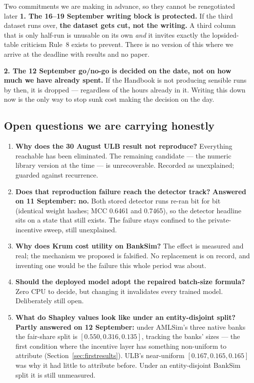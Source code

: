 \documentclass[11pt]{article}
\begin{document}
\begin{keybox}{Two commitments we are making in advance, so they cannot be renegotiated later}
\textbf{1. The 16--19 September writing block is protected.} If the third dataset runs over, \textbf{the
dataset gets cut, not the writing.} A third column that is only half-run is unusable on its own
\emph{and} it invites exactly the lopsided-table criticism Rule~8 exists to prevent. There is no version
of this where we arrive at the deadline with results and no paper.

\textbf{2. The 12 September go/no-go is decided on the date, not on how much we have already spent.} If
the Handbook is not producing sensible runs by then, it is dropped --- regardless of the hours already
in it. Writing this down now is the only way to stop sunk cost making the decision on the day.
\end{keybox}

\subsection{Open questions we are carrying honestly}

\begin{enumerate}[label=\textbf{Q\arabic*.}]
  \item \textbf{Why does the 30 August ULB result not reproduce?} Everything reachable has been
  eliminated. The remaining candidate --- the numeric library version at the time --- is unrecoverable.
  Recorded as unexplained; guarded against recurrence.
  \item \textbf{Does that reproduction failure reach the detector track?} \textbf{Answered on
  11 September: no.} Both stored detector runs re-ran bit for bit (identical weight hashes; MCC 0.6461
  and 0.7465), so the detector headline sits on a state that still exists. The failure stays confined to
  the private-incentive sweep, still unexplained.
  \item \textbf{Why does Krum cost utility on BankSim?} The effect is measured and real; the mechanism
  we proposed is falsified. No replacement is on record, and inventing one would be the failure this
  whole period was about.
  \item \textbf{Should the deployed model adopt the repaired batch-size formula?} Zero CPU to decide,
  but changing it invalidates every trained model. Deliberately still open.
  \item \textbf{What do Shapley values look like under an entity-disjoint split?} \textbf{Partly answered
  on 12 September:} under AMLSim's three native banks the fair-share split is $[0.550, 0.316, 0.135]$,
  tracking the banks' sizes --- the first condition where the incentive layer has something non-uniform
  to attribute (Section~\ref{sec:firstresults}). ULB's near-uniform $[0.167, 0.165, 0.165]$ was why it had
  little to attribute before. Under an entity-disjoint BankSim split it is still unmeasured.
\end{enumerate}
\end{document}
